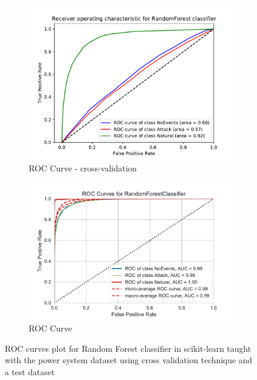 \begin{figure}[h]
    \centering
    \begin{subfigure}[t]{110mm}
        \centering
        \includegraphics[page=1, width=\linewidth]{images/results_scikit/RandomForest}
        \caption{ROC Curve - cross-validation}
        \label{fig:scikit_RF_ROC}
    \end{subfigure}
    \begin{subfigure}[t]{110mm}
        \centering
        \includegraphics[page=1, width=\linewidth]{images/roc_3c}
        \caption{ROC Curve}
        \label{fig:scikit_RF_ROC}
    \end{subfigure}
    \caption{ROC curves plot for Random Forest classifier in scikit-learn taught with the power system dataset using cross validation technique and a test dataset}
    \label{fig:ROCCM_RF}
\end{figure}


